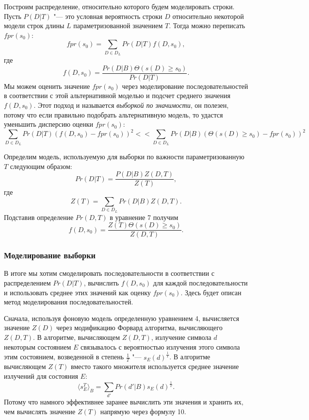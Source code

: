 \documentclass[]{article}
\begin{document}
			Построим распределение, относительно которого будем моделировать строки. Пусть $P(D|T)$ "--- это условная вероятность строки $D$ относительно некоторой модели строк длины $L$ параметризованной значением $T$. Тогда можно переписать $fpr(s_{0})$:
			\begin{equation}
				fpr(s_{0}) = \sum_{D \in D_{L}} Pr(D|T) f(D,s_{0}),
			\end{equation}
			где
			\begin{equation}
				f(D,s_{0}) = \frac{Pr(D|B) \Theta(s(D) \geq s_{0})}{Pr(D|T)}.
			\end{equation}
			Мы можем оценить значение $fpr(s_{0})$ через моделирование последовательностей в соответствии с этой альтернативной моделью и подсчет среднего значения $f(D,s_{0})$. Этот подход и называется \textit{выборкой по значимости}, он полезен, потому что если правильно подобрать альтернативную модель, то удастся уменьшить дисперсию оценки $fpr(s_{0})$:
			\begin{equation}
				\sum_{D \in D_{L}}Pr(D|T)(f(D, s_{0})-fpr(s_{0}))^{2} <\!\!< \sum_{D \in D_{L}}Pr(D|B)(\Theta(s(D) \geq s_{0})-fpr(s_{0}))^2
			\end{equation}
		
			Определим модель, используемую для выборки по важности параметризованную $T$ следующим образом:
			\begin{equation}
				Pr(D|T) = \frac{P(D|B)Z(D,T)}{Z(T)},
			\end{equation}							
			где 
			\begin{equation}
				Z(T) = \sum_{D \in D_{L}}Pr(D|B)Z(D,T).
			\end{equation}	
			Подставив определение $Pr(D,T)$ в уравнение 7 получим 
			\begin{equation}
				f(D,s_{0}) = \frac{Z(T)\Theta(s(D) \geq s_{0})}{Z(D,T)}.
			\end{equation}		
		
			\subsubsection{Моделирование выборки}
			В итоге мы хотим смоделировать последовательности в соответствии с распределением $Pr(D|T)$, вычислить $f(D, s_{0})$ для каждой последовательности и использовать среднее этих значений как оценку $fpr(s_{0})$. Здесь будет описан метод моделирования последовательностей.
			
			Сначала, используя фоновую модель определенную уравнением 4, вычисляется значение $Z(D)$ через модификацию Форвард алгоритма, вычисляющего $Z(D,T)$. В алгоритме, вычисляющем $Z(D,T)$, излучение символа $d$ некоторым состоянием $E$ связывалось с вероятностью излучения этого символа этим состоянием, возведенной в степень $\frac{1}{T}$ "--- $s_{E}(d)^{\frac{1}{T}}$. В алгоритме вычисляющем $Z(T)$ вместо такого множителя используется среднее значение излучений для состояния $E$:
			\begin{equation}
				\langle s_{E}^{T} \rangle_{B} = \sum_{d'}Pr(d'|B)s_{E}(d)^{\frac{1}{T}}.
			\end{equation}					
			Потому что намного эффективнее заранее вычислить эти значения и хранить их, чем вычислять значение $Z(T)$ напрямую через формулу 10.
			
\end{document}
